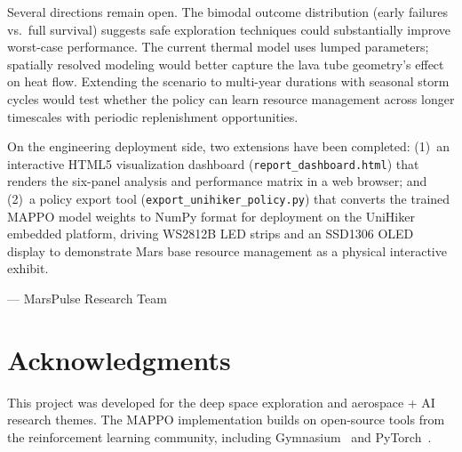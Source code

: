\documentclass[11pt,a4paper]{article}
\begin{document}
Several directions remain open. The bimodal outcome distribution (early failures vs.\ full survival) suggests safe exploration techniques could substantially improve worst-case performance. The current thermal model uses lumped parameters; spatially resolved modeling would better capture the lava tube geometry's effect on heat flow. Extending the scenario to multi-year durations with seasonal storm cycles would test whether the policy can learn resource management across longer timescales with periodic replenishment opportunities.

On the engineering deployment side, two extensions have been completed: (1)~an interactive HTML5 visualization dashboard (\texttt{report\_dashboard.html}) that renders the six-panel analysis and performance matrix in a web browser; and (2)~a policy export tool (\texttt{export\_unihiker\_policy.py}) that converts the trained MAPPO model weights to NumPy format for deployment on the UniHiker embedded platform, driving WS2812B LED strips and an SSD1306 OLED display to demonstrate Mars base resource management as a physical interactive exhibit.

\vspace{20pt}
\begin{flushright}
  --- MarsPulse Research Team
\end{flushright}

\section*{Acknowledgments}
This project was developed for the deep space exploration and aerospace + AI research themes. The MAPPO implementation builds on open-source tools from the reinforcement learning community, including Gymnasium~\cite{gymnasium} and PyTorch~\cite{pytorch}.
\end{document}
